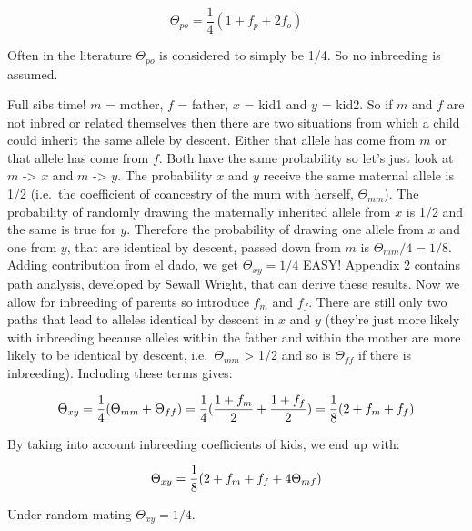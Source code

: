 \documentclass[
]{book}
\begin{document}
\begin{equation}
  \Theta_{po} = \frac{1}{4}(1 + f_p + 2f_o)
  \label{eq:coef-coan-parent-offspring}
\end{equation}

Often in the literature \(\Theta_{po}\) is considered to simply be 1/4. So no inbreeding is assumed.

Full sibs time! \(m\) = mother, \(f\) = father, \(x\) = kid1 and \(y\) = kid2. So if \(m\) and \(f\) are not inbred or related themselves then there are two situations from which a child could inherit the same allele by descent. Either that allele has come from \(m\) or that allele has come from \(f\). Both have the same probability so let's just look at \(m\) -\textgreater{} \(x\) and \(m\) -\textgreater{} \(y\). The probability \(x\) and \(y\) receive the same maternal allele is 1/2 (i.e.~the coefficient of coancestry of the mum with herself, \(\Theta_{mm}\)). The probability of randomly drawing the maternally inherited allele from \(x\) is 1/2 and the same is true for \(y\). Therefore the probability of drawing one allele from \(x\) and one from \(y\), that are identical by descent, passed down from \(m\) is \(\Theta_{mm}/4 = 1/8\). Adding contribution from el dado, we get \(\Theta_{xy} = 1/4\) EASY! Appendix 2 contains path analysis, developed by Sewall Wright, that can derive these results. Now we allow for inbreeding of parents so introduce \(f_m\) and \(f_f\). There are still only two paths that lead to alleles identical by descent in \(x\) and \(y\) (they're just more likely with inbreeding because alleles within the father and within the mother are more likely to be identical by descent, i.e.~\(\Theta_{mm}\) \textgreater{} 1/2 and so is \(\Theta_{ff}\) if there is inbreeding). Including these terms gives:

\begin{equation}
  \Theta_{xy} = \frac{1}{4}(\Theta_{mm} + \Theta_{ff}) = \frac{1}{4}(\frac{1 + f_m}{2} + \frac{1 + f_f}{2}) = \frac{1}{8}(2 + f_m + f_f) \notag
\end{equation}

By taking into account inbreeding coefficients of kids, we end up with:

\begin{equation}
  \Theta_{xy} = \frac{1}{8}(2 + f_m + f_f + 4\Theta_{mf}) \notag
  \label{eq:coef-coan-full-sibs}
\end{equation}

Under random mating \(\Theta_{xy} = 1/4\).
\end{document}
